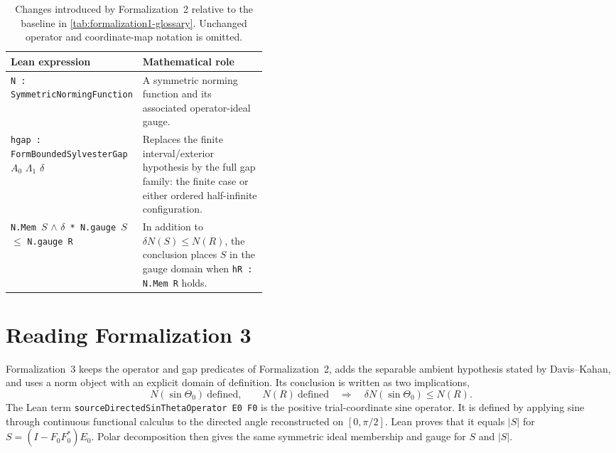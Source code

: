 \begin{table}[H]
\centering
\small
\caption{Changes introduced by Formalization~2 relative to the baseline in
\cref{tab:formalization1-glossary}.  Unchanged operator and coordinate-map
notation is omitted.}
\label{tab:formalization2-glossary}
\begin{tabularx}{\linewidth}{@{}>{\raggedright\arraybackslash}p{0.42\linewidth}>{\raggedright\arraybackslash}X@{}}
\toprule
Lean expression & Mathematical role \\
\midrule
\texttt{N : SymmetricNormingFunction}
  & A symmetric norming function and its associated operator-ideal gauge. \\
\texttt{hgap : FormBoundedSylvesterGap }$A_0$ $\Lambda_1$ $\delta$
  & Replaces the finite interval/exterior hypothesis by the full gap family:
    the finite case or either ordered half-infinite configuration. \\
\texttt{N.Mem }$S$ $\land$ $\delta$\texttt{ * N.gauge }$S$
$\le$ \texttt{N.gauge R}
  & In addition to $\delta N(S)\le N(R)$, the conclusion places $S$ in the
    gauge domain when \texttt{hR : N.Mem R} holds. \\
\bottomrule
\end{tabularx}
\end{table}

\section{Reading Formalization 3}
\label{app:formalization3}

Formalization~3 keeps the operator and gap predicates of Formalization~2,
adds the separable ambient hypothesis stated by Davis--Kahan, and uses a norm
object with an explicit domain of definition.  Its conclusion is written as two
implications,
\[
  N(\sin\Theta_0)\ \text{defined},\qquad N(R)\ \text{defined}
  \quad\Longrightarrow\quad
  \delta N(\sin\Theta_0)\le N(R).
\]
The Lean term \texttt{sourceDirectedSinThetaOperator E0 F0} is the positive
trial-coordinate sine operator.  It is defined by applying sine through
continuous functional calculus to the directed angle reconstructed on
$[0,\pi/2]$.  Lean proves that it equals $|S|$ for
$S=(I-F_0F_0^*)E_0$.  Polar decomposition then gives the same symmetric ideal
membership and gauge for $S$ and $|S|$.


